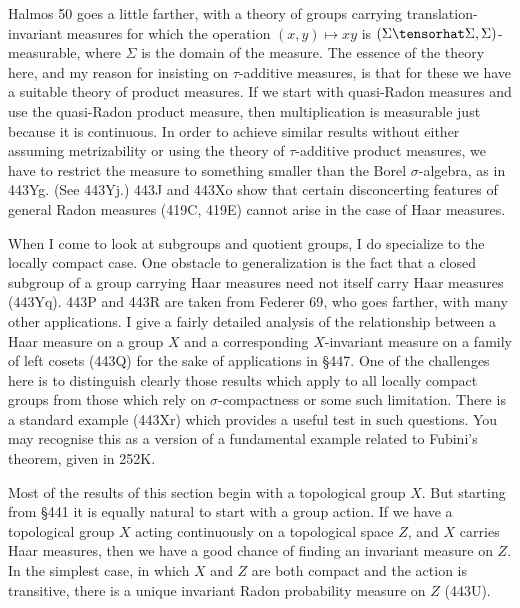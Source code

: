 {{\smc Halmos 50} goes a little farther, with a theory of groups carrying
translation-invariant measures for which the operation $(x,y)\mapsto xy$
is $(\Sigma\tensorhat\Sigma,\Sigma)$-measurable, where $\Sigma$ is the
domain of the measure.   The essence of the theory here, and my reason
for insisting on $\tau$-additive measures, is that for these we
have a suitable theory of product measures.   If we start with
quasi-Radon measures and use the quasi-Radon product measure, then
multiplication is measurable just because it is continuous.   In order
to achieve similar results without either assuming metrizability or
using the theory of $\tau$-additive product measures, we have to
restrict the measure to something smaller than the Borel
$\sigma$-algebra, as in 443Yg.   (See 443Yj.)
443J and 443Xo show that certain disconcerting features of general
Radon measures (419C, 419E) cannot arise in the case of Haar measures.

When I come to look at subgroups and quotient groups, I do specialize to
the locally compact case.   One obstacle to generalization is the fact
that a closed subgroup
of a group carrying Haar measures need not itself carry Haar measures
(443Yq).   443P and 443R are taken from {\smc Federer 69}, who goes
farther, with many other applications.   I give a fairly detailed
analysis of the relationship between a Haar measure on a group $X$ and a
corresponding $X$-invariant measure on a family of left cosets (443Q)
for the sake of applications in \S447.   One of the challenges here is
to distinguish clearly those results which apply to all locally compact
groups from those which rely on $\sigma$-compactness or some such
limitation.   There is a standard example (443Xr) which provides a
useful test in such questions.   You may recognise this as a version of
a fundamental example related to Fubini's theorem, given in 252K.

Most of the results of this section begin with a topological group $X$.
But starting from \S441 it is equally natural to start with a group
action.   If we have a topological group $X$ acting continuously on a
topological space $Z$, and $X$ carries Haar measures, then we have a
good chance of finding an invariant measure on $Z$.   In the simplest
case, in which $X$ and $Z$ are both compact and the action is
transitive, there is a unique invariant Radon probability measure on $Z$
(443U).
}%

\discrpage



